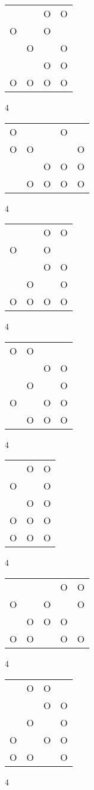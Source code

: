 \begin{tabular}{|m{0.2cm}m{0.2cm}m{0.2cm}m{0.2cm}|}\hline
 & &O&O\\
O& &O& \\
 &O& &O\\
 & &O&O\\
O&O&O&O\\
\hline\end{tabular}4
\begin{tabular}{|m{0.2cm}m{0.2cm}m{0.2cm}m{0.2cm}m{0.2cm}|}\hline
O& & &O& \\
O&O& & &O\\
 & &O&O&O\\
 &O&O&O&O\\
\hline\end{tabular}4
\begin{tabular}{|m{0.2cm}m{0.2cm}m{0.2cm}m{0.2cm}|}\hline
 & &O&O\\
O& &O& \\
 & &O&O\\
 &O& &O\\
O&O&O&O\\
\hline\end{tabular}4
\begin{tabular}{|m{0.2cm}m{0.2cm}m{0.2cm}m{0.2cm}|}\hline
O&O& & \\
 & &O&O\\
 &O& &O\\
O& &O&O\\
 &O&O&O\\
\hline\end{tabular}4
\begin{tabular}{|m{0.2cm}m{0.2cm}m{0.2cm}|}\hline
 &O&O\\
O& &O\\
 &O&O\\
O&O&O\\
O&O&O\\
\hline\end{tabular}4
\begin{tabular}{|m{0.2cm}m{0.2cm}m{0.2cm}m{0.2cm}m{0.2cm}|}\hline
 & & &O&O\\
O& &O& &O\\
 &O&O&O& \\
O&O& &O&O\\
\hline\end{tabular}4
\begin{tabular}{|m{0.2cm}m{0.2cm}m{0.2cm}m{0.2cm}|}\hline
 &O&O& \\
 & &O&O\\
 &O& &O\\
O& &O&O\\
O&O& &O\\
\hline\end{tabular}4
